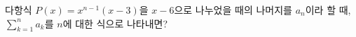 다항식 $P(x)=x^{n-1}(x-3)$을 $x-6$으로 나누었을 때의 나머지를 $a_n$이라 할 때, $\displaystyle\sum_{k=1}^{n} a_k$를 $n$에 대한 식으로 나타내면?
